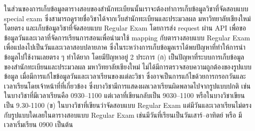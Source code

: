 ในส่วนของการเก็บข้อมูลตารางสอบของสำนักทะเบียนนั้นเราจะต้องทำการเก็บข้อมูลวิชาที่จัดสอบแบบ special exam ซึ่งสามารถดูรายชื่อวิชาได้จากเว็บสำนักทะเบียนและประมวลผล มหาวิทยาลัยเชียงใหม่ โดยตรง
และเก็บข้อมูลวิชาที่จัดสอบแบบ Regular Exam โดยการส่ง request ผ่าน API เพื่อขอข้อมูลวันและเวลาที่จัดการเรียนการสอนเพื่อนำมาใช้ mapping กับตารางสอบแบบ Regular Exam เพื่อแปลงไปเป็นวันและเวลาสอบปลายภาค
ซึ่งในระหว่างการเก็บข้อมูลเราได้พบปัญหาที่ทำให้การนำข้อมูลไปใช้งานเลยตรง ๆ ทำได้ยาก โดยมีปัญหาอยู่ 2 ประการ (ก) เป็นปัญหาที่ระบบการเก็บข้อมูลของสำนักทะเบียนและประมวลผล มหาวิทยาลัยเชียงใหม่ 
ไม่ได้มีการตรวจสอบความถูกต้องของรูปแบบข้อมูล เมื่อมีการแก้ไขข้อมูลวันและเวลาเรียนของแต่ละวิชา ซึ่งอาจเป็นการแก้ไขด้วยการกรอกวันและเวลาเรียนโดยเจ้าหน้าที่ที่เกี่ยวข้อง ซึ่งบางวิชามีการแสดงผลเวลาเรียนผิดพลาดไปจากรูปแบบปกติ
เช่นในบางวิชาที่มีเวลาเรียนคือ 0930--1100 แต่เวลาที่เขียนกลับเป็น 9030--1100 หรือในบางวิชาเขียนเป็น 9.30-1100 (ข) ในบางวิชาที่เขียนว่าจัดสอบแบบ Regular Exam แต่มีวันและเวลาเรียนไม่ตรงกับรูปแบบใดเลยในตารางสอบแบบ Regular Exam
เช่นมีวันที่เรียนเป็นวันเสาร์--อาทิตย์ หรือ มีเวลาเริ่มเรียน 0900 เป็นต้น 


